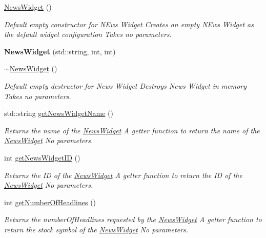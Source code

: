 \begin{DoxyCompactItemize}
\item 
\mbox{\hyperlink{class_news_widget_a9437347c57951bcd319ee62012b154c7}{News\+Widget}} ()
\begin{DoxyCompactList}\small\item\em Default empty constructor for N\+Ews Widget  Creates an empty N\+Ews Widget as the default widget configuration  Takes no parameters. \end{DoxyCompactList}\item 
\mbox{\label{class_news_widget_a554d8bd0ec17ad06e7100095ac8ade6c}} 
{\bfseries News\+Widget} (std\+::string, int, int)
\item 
\mbox{\hyperlink{class_news_widget_a24c2680f9e53728e3e0674952e8a21bc}{$\sim$\+News\+Widget}} ()
\begin{DoxyCompactList}\small\item\em Default empty destructor for News Widget  Destroys News Widget in memory  Takes no parameters. \end{DoxyCompactList}\item 
std\+::string \mbox{\hyperlink{class_news_widget_a0af651adfe7c7edb7f8063589162de8f}{get\+News\+Widget\+Name}} ()
\begin{DoxyCompactList}\small\item\em Returns the name of the \mbox{\hyperlink{class_news_widget}{News\+Widget}}  A getter function to return the name of the \mbox{\hyperlink{class_news_widget}{News\+Widget}}  No parameters. \end{DoxyCompactList}\item 
int \mbox{\hyperlink{class_news_widget_a446535e974cd300e9952a083290cfc30}{get\+News\+Widget\+ID}} ()
\begin{DoxyCompactList}\small\item\em Returns the ID of the \mbox{\hyperlink{class_news_widget}{News\+Widget}}  A getter function to return the ID of the \mbox{\hyperlink{class_news_widget}{News\+Widget}}  No parameters. \end{DoxyCompactList}\item 
int \mbox{\hyperlink{class_news_widget_adb74146c7a393d38c6a883bed0fb1012}{get\+Number\+Of\+Headlines}} ()
\begin{DoxyCompactList}\small\item\em Returns the number\+Of\+Headlines requested by the \mbox{\hyperlink{class_news_widget}{News\+Widget}}  A getter function to return the stock symbol of the \mbox{\hyperlink{class_news_widget}{News\+Widget}}  No parameters. \end{DoxyCompactList}\item 

\end{DoxyCompactItemize}
